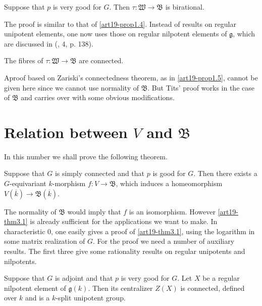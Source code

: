 \begin{proposition}\label{art19-prop2.4}
Suppose that $p$ is very good for $G$. Then $\tau :\mathfrak{W}\to \mathfrak{B}$ is birational.
\end{proposition}

The proof is similar to that of \ref{art19-prop1.4}. Instead of results on regular unipotent elements, one now uses those on regular nilpotent elements of $\mathfrak{g}$, which are discussed in (\cite{art19-key14}, 4, p. 138).

\begin{proposition}\label{art19-prop2.5}
The fibres of $\tau : \mathfrak{W}\to \mathfrak{B}$ are connected.
\end{proposition}

A\pageoriginale proof based on Zariski's connectedness theorem, as in \ref{art19-prop1.5}, cannot be given here since we cannot use normality of $\mathfrak{B}$. But Tits' proof works in the case of $\mathfrak{B}$ and carries over with some obvious modifications.

\section{Relation between $V$ and $\mathfrak{B}$}\label{art19-sec3}

In this number we shall prove the following theorem.

\begin{theorem}\label{art19-thm3.1}
Suppose that $G$ is simply connected and that $p$ is good for $G$. Then there exists a $G$-equivariant $k$-morphism $f:V\to \mathfrak{B}$, which induces a homeomorphism $V(\overline{k})\to \mathfrak{B}(\overline{k})$.
\end{theorem}

The normality of $\mathfrak{B}$ would imply that $f$ is an isomorphism. However \ref{art19-thm3.1} is already sufficient for the applications we want to make. In characteristic $0$, one easily gives a proof of \ref{art19-thm3.1}, using the logarithm in some matrix realization of $G$. For the proof we need a number of auxiliary results. The first three give some rationality results on regular unipotents and nilpotents.

\begin{proposition}\label{art19-prop3.2}
Suppose that $G$ is adjoint and that $p$ is very good for $G$. Let $X$ be a regular nilpotent element of $\mathfrak{g}(k)$. Then its centralizer $Z(X)$ is connected, defined over $k$ and is a $k$-split unipotent group.
\end{proposition}

